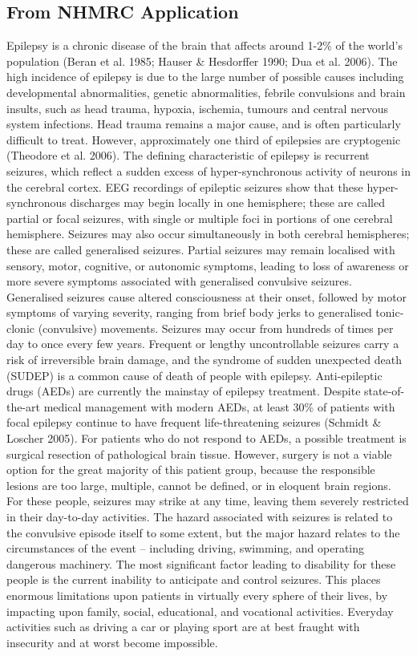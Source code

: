 \documentclass[]{article}
\begin{document}
\subsection{From NHMRC Application}
Epilepsy is a chronic disease of the brain that affects around 1-2\% of the world’s population (Beran et al. 1985; Hauser \& Hesdorffer 1990; Dua et al. 2006). The high incidence of epilepsy is due to the large number of possible causes including developmental abnormalities, genetic abnormalities, febrile convulsions and brain insults, such as head trauma, hypoxia, ischemia, tumours and central nervous system infections. Head trauma remains a major cause, and is often particularly difficult to treat. However, approximately one third of epilepsies are cryptogenic (Theodore et al. 2006).
The defining characteristic of epilepsy is recurrent seizures, which reflect a sudden excess of hyper-synchronous activity of neurons in the cerebral cortex. EEG recordings of epileptic seizures show that these hyper-synchronous discharges may begin locally in one hemisphere; these are called partial or focal seizures, with single or multiple foci in portions of one cerebral hemisphere. Seizures may also occur simultaneously in both cerebral hemispheres; these are called generalised seizures. Partial seizures may remain localised with sensory, motor, cognitive, or autonomic symptoms, leading to loss of awareness or more severe symptoms associated with generalised convulsive seizures. Generalised seizures cause altered consciousness at their onset, followed by motor symptoms of varying severity, ranging from brief body jerks to generalised tonic-clonic (convulsive) movements. Seizures may occur from hundreds of times per day to once every few years. Frequent or lengthy uncontrollable seizures carry a risk of irreversible brain damage, and the syndrome of sudden unexpected death (SUDEP) is a common cause of death of people with epilepsy.
Anti-epileptic drugs (AEDs) are currently the mainstay of epilepsy treatment. Despite state-of-the-art medical management with modern AEDs, at least 30\% of patients with focal epilepsy continue to have frequent life-threatening seizures (Schmidt \& Loscher 2005). For patients who do not respond to AEDs, a possible treatment is surgical resection of pathological brain tissue.  However, surgery is not a viable option for the great majority of this patient group, because the responsible lesions are too large, multiple, cannot be defined, or in eloquent brain regions. For these people, seizures may strike at any time, leaving them severely restricted in their day-to-day activities. The hazard associated with seizures is related to the convulsive episode itself to some extent, but the major hazard relates to the circumstances of the event – including driving, swimming, and operating dangerous machinery. The most significant factor leading to disability for these people is the current inability to anticipate and control seizures. This places enormous limitations upon patients in virtually every sphere of their lives, by impacting upon family, social, educational, and vocational activities. Everyday activities such as driving a car or playing sport are at best fraught with insecurity and at worst become impossible.
\end{document}
